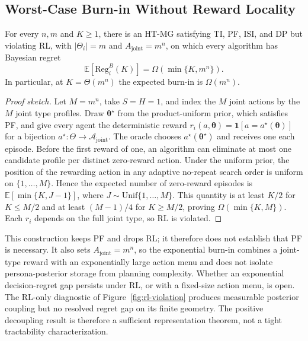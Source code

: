 \subsection{Worst-Case Burn-in Without Reward Locality}
\label{app:lower-no-rl}
\label{sec:lower-no-rl-app}

\begin{theorem}
\label{thm:lower-no-rl}
For every $n,m$ and $K\geq1$, there is an HT-MG satisfying TI, PF, ISI, and DP but violating RL, with $|\Theta_i|=m$ and $A_{\mathrm{joint}}=m^n$, on which every algorithm has Bayesian regret
\begin{equation}
\mathbb E[\mathrm{Reg}_i^B(K)] = \Omega\!\left(\min\{K,m^n\}\right).
\end{equation}
In particular, at $K=\Theta(m^n)$ the expected burn-in is $\Omega(m^n)$.
\end{theorem}

\begin{proof}[Proof sketch]
Let $M=m^n$, take $S=H=1$, and index the $M$ joint actions by the $M$ joint type profiles. Draw $\boldsymbol\theta^\star$ from the product-uniform prior, which satisfies PF, and give every agent the deterministic reward $r_i(a,\boldsymbol\theta)=\mathbf1[a=a^\star(\boldsymbol\theta)]$ for a bijection $a^\star\colon\Theta\to\mathcal A_{\mathrm{joint}}$. The oracle chooses $a^\star(\boldsymbol\theta^\star)$ and receives one each episode. Before the first reward of one, an algorithm can eliminate at most one candidate profile per distinct zero-reward action. Under the uniform prior, the position of the rewarding action in any adaptive no-repeat search order is uniform on $\{1,\ldots,M\}$. Hence the expected number of zero-reward episodes is $\mathbb E[\min\{K,J-1\}]$, where $J\sim\mathrm{Unif}\{1,\ldots,M\}$. This quantity is at least $K/2$ for $K\leq M/2$ and at least $(M-1)/4$ for $K\geq M/2$, proving $\Omega(\min\{K,M\})$. Each $r_i$ depends on the full joint type, so RL is violated.
\end{proof}

\begin{remark}
\label{rem:lower-bound-scope}
This construction keeps PF and drops RL; it therefore does not establish that PF is necessary. It also sets $A_{\mathrm{joint}}=m^n$, so the exponential burn-in combines a joint-type reward with an exponentially large action menu and does not isolate persona-posterior storage from planning complexity. Whether an exponential decision-regret gap persists under RL, or with a fixed-size action menu, is open. The RL-only diagnostic of Figure~\ref{fig:rl-violation} produces measurable posterior coupling but no resolved regret gap on its finite geometry. The positive decoupling result is therefore a sufficient representation theorem, not a tight tractability characterization.
\end{remark}

